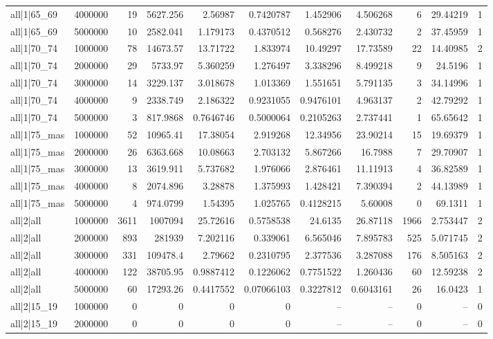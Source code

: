 \begin{tabular}{lrrrrrrrrrr}
all|1|65\_69 & 4000000 & 19 & 5627.256 & 2.56987 & 0.7420787 & 1.452906 & 4.506268 & 6 & 29.44219 & 1 \\
all|1|65\_69 & 5000000 & 10 & 2582.041 & 1.179173 & 0.4370512 & 0.568276 & 2.430732 & 2 & 37.45959 & 1 \\
all|1|70\_74 & 1000000 & 78 & 14673.57 & 13.71722 & 1.833974 & 10.49297 & 17.73589 & 22 & 14.40985 & 2 \\
all|1|70\_74 & 2000000 & 29 & 5733.97 & 5.360259 & 1.276497 & 3.338296 & 8.499218 & 9 & 24.5196 & 1 \\
all|1|70\_74 & 3000000 & 14 & 3229.137 & 3.018678 & 1.013369 & 1.551651 & 5.791135 & 3 & 34.14996 & 1 \\
all|1|70\_74 & 4000000 & 9 & 2338.749 & 2.186322 & 0.9231055 & 0.9476101 & 4.963137 & 2 & 42.79292 & 1 \\
all|1|70\_74 & 5000000 & 3 & 817.9868 & 0.7646746 & 0.5000064 & 0.2105263 & 2.737441 & 1 & 65.65642 & 1 \\
all|1|75\_mas & 1000000 & 52 & 10965.41 & 17.38054 & 2.919268 & 12.34956 & 23.90214 & 15 & 19.69379 & 1 \\
all|1|75\_mas & 2000000 & 26 & 6363.668 & 10.08663 & 2.703132 & 5.867266 & 16.7988 & 7 & 29.70907 & 1 \\
all|1|75\_mas & 3000000 & 13 & 3619.911 & 5.737682 & 1.976066 & 2.876461 & 11.11913 & 4 & 36.82589 & 1 \\
all|1|75\_mas & 4000000 & 8 & 2074.896 & 3.28878 & 1.375993 & 1.428421 & 7.390394 & 2 & 44.13989 & 1 \\
all|1|75\_mas & 5000000 & 4 & 974.0799 & 1.54395 & 1.025765 & 0.4128215 & 5.60008 & 0 & 69.1311 & 1 \\
all|2|all & 1000000 & 3611 & 1007094 & 25.72616 & 0.5758538 & 24.6135 & 26.87118 & 1966 & 2.753447 & 2 \\
all|2|all & 2000000 & 893 & 281939 & 7.202116 & 0.339061 & 6.565046 & 7.895783 & 525 & 5.071745 & 2 \\
all|2|all & 3000000 & 331 & 109478.4 & 2.79662 & 0.2310795 & 2.377536 & 3.287088 & 176 & 8.505163 & 2 \\
all|2|all & 4000000 & 122 & 38705.95 & 0.9887412 & 0.1226062 & 0.7751522 & 1.260436 & 60 & 12.59238 & 2 \\
all|2|all & 5000000 & 60 & 17293.26 & 0.4417552 & 0.07066103 & 0.3227812 & 0.6043161 & 26 & 16.0423 & 1 \\
all|2|15\_19 & 1000000 & 0 & 0 & 0 & 0 & -- & -- & 0 & -- & 0 \\
all|2|15\_19 & 2000000 & 0 & 0 & 0 & 0 & -- & -- & 0 & -- & 0 \\

\end{tabular}
